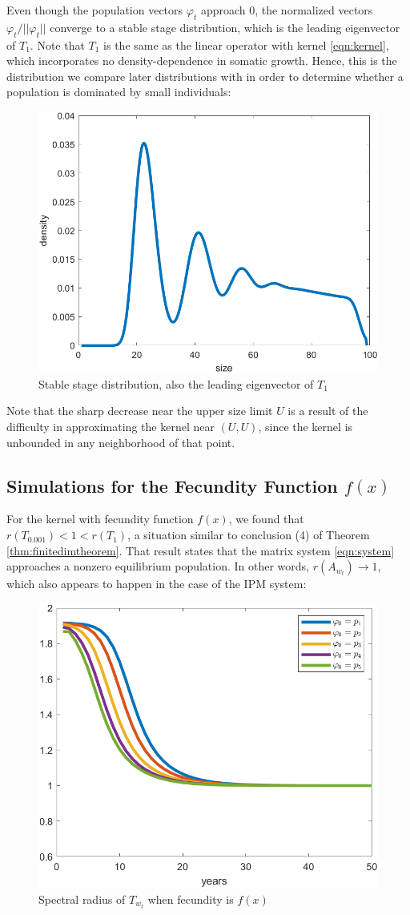 Even though the population vectors $\varphi_t$ approach 0, the normalized vectors $\varphi_t / || \varphi_t||$ converge to a stable stage distribution, which is the leading eigenvector of $T_1$. Note that $T_1$ is the same as the linear operator with kernel \ref{eqn:kernel}, which incorporates no density-dependence in somatic growth. Hence, this is the distribution we compare later distributions with in order to determine whether a population is dominated by small individuals:

\begin{figure}[H]
	\centering
	\includegraphics[width=0.6\linewidth]{Images/F=0.05/ssd_when_f=0.05}
	\caption{Stable stage distribution, also the leading eigenvector of $T_1$}
	\label{fig:ssdwhenf=0.05}
\end{figure}

Note that the sharp decrease near the upper size limit $U$ is a result of the difficulty in approximating the kernel near $(U,U)$, since the kernel is unbounded in any neighborhood of that point.

\subsection{Simulations for the Fecundity Function $f(x)$} \label{subsec:f(x)}

For the kernel with fecundity function $f(x)$, we found that $r(T_{0.001}) < 1 < r(T_1)$, a situation similar to conclusion (4) of Theorem \ref{thm:finitedimtheorem}. That result states that the matrix system \eqref{eqn:system} approaches a nonzero equilibrium population. In other words, $r(A_{w_t}) \to 1$, which also appears to happen in the case of the IPM system:

\begin{figure}[H]
	\centering
	\includegraphics[width=0.6\linewidth]{Images/F=1/spectral_radius_when_f=1}
	\caption{Spectral radius of $T_{w_t}$ when fecundity is $f(x)$}
	\label{fig:spectralradiuswhenf=1}
\end{figure}

